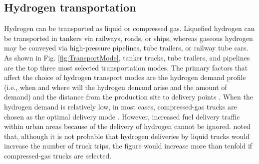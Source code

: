 \documentclass[11pt,3p]{elsarticle}
\begin{document}
\begin{table}[!htb]
\centering
\caption{Three levels of storage in HSCN}
\label{tab:ThreeLevelStorage}
\end{table}

\subsection{Hydrogen transportation}

Hydrogen can be transported as liquid or compressed gas. Liquefied hydrogen can be transported in tankers via railways, roads, or ships, whereas gaseous hydrogen may be conveyed via high-pressure pipelines, tube trailers, or railway tube cars. As shown in Fig. \ref{fig:TransportMode}, tanker trucks, tube trailers, and pipelines are the top three most selected transportation modes. The primary factors that affect the choice of hydrogen transport modes are the hydrogen demand profile (i.e., when and where will the hydrogen demand arise and the amount of demand) and the distance from the production site to delivery points \citep{lahnaoui2018optimizing}. When the hydrogen demand is relatively low, in most cases, compressed-gas trucks are chosen as the optimal delivery mode \citep{parker2010waste}. However, increased fuel delivery traffic within urban areas because of the delivery of hydrogen cannot be ignored. \citet{parker2010waste} noted that, although it is not probable that hydrogen deliveries by liquid trucks would increase the number of truck trips, the figure would increase more than tenfold if compressed-gas trucks are selected. 
\end{document}
